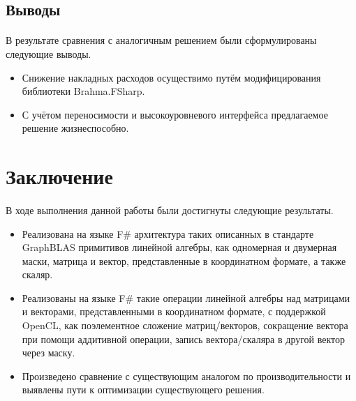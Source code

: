 \documentclass[14pt]{matmex-diploma-custom}
\begin{document}
\subsection{Выводы}
\paragraph{}В результате сравнения с аналогичным решением были сформулированы следующие выводы.

\begin{itemize}
    \item Снижение накладных расходов осуществимо путём модифицирования библиотеки Brahma.FSharp.
    \item С учётом переносимости и высокоуровневого интерфейса предлагаемое решение жизнеспособно.
\end{itemize}


\section*{Заключение}
\paragraph{} В ходе выполнения данной работы были достигнуты следующие результаты.
\begin{itemize}
    \item Реализована на языке F\# архитектура таких описанных в стандарте GraphBLAS примитивов линейной алгебры, как одномерная и двумерная маски, матрица и вектор, представленные в координатном формате, а также скаляр.
    \item Реализованы на языке F\# такие операции линейной алгебры над матрицами и векторами, представленными в координатном формате, с поддержкой OpenCL, как поэлементное сложение матриц/векторов, сокращение вектора при помощи аддитивной операции, запись вектора/скаляра в другой вектор через маску.
    \item Произведено сравнение с существующим аналогом по производительности и выявлены пути к оптимизации существующего решения.
\end{itemize}
\end{document}

